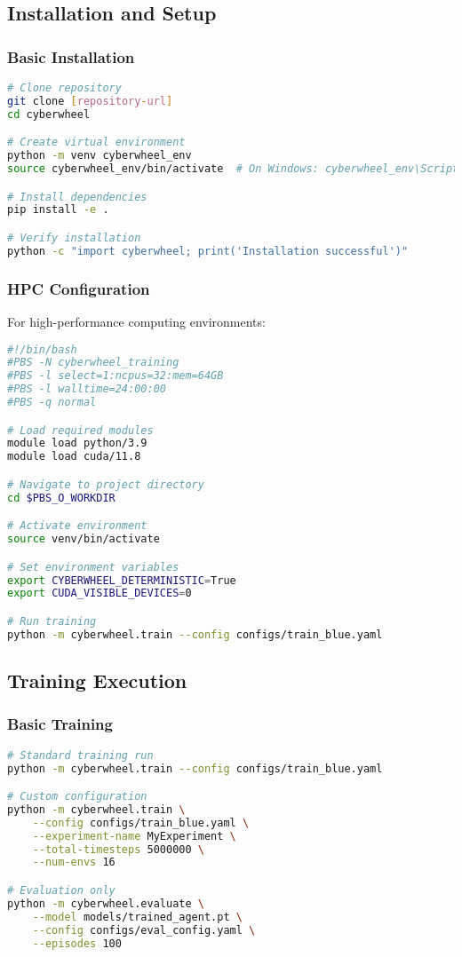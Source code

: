 \documentclass[12pt,a4paper]{article}
\begin{document}
\subsection{Installation and Setup}

\subsubsection{Basic Installation}
\begin{lstlisting}[language=bash, caption=Basic Setup]
# Clone repository
git clone [repository-url]
cd cyberwheel

# Create virtual environment
python -m venv cyberwheel_env
source cyberwheel_env/bin/activate  # On Windows: cyberwheel_env\Scripts\activate

# Install dependencies
pip install -e .

# Verify installation
python -c "import cyberwheel; print('Installation successful')"
\end{lstlisting}

\subsubsection{HPC Configuration}
For high-performance computing environments:

\begin{lstlisting}[language=bash, caption=HPC Setup Script]
#!/bin/bash
#PBS -N cyberwheel_training
#PBS -l select=1:ncpus=32:mem=64GB
#PBS -l walltime=24:00:00
#PBS -q normal

# Load required modules
module load python/3.9
module load cuda/11.8

# Navigate to project directory
cd $PBS_O_WORKDIR

# Activate environment
source venv/bin/activate

# Set environment variables
export CYBERWHEEL_DETERMINISTIC=True
export CUDA_VISIBLE_DEVICES=0

# Run training
python -m cyberwheel.train --config configs/train_blue.yaml
\end{lstlisting}

\subsection{Training Execution}

\subsubsection{Basic Training}
\begin{lstlisting}[language=bash, caption=Training Execution]
# Standard training run
python -m cyberwheel.train --config configs/train_blue.yaml

# Custom configuration
python -m cyberwheel.train \
    --config configs/train_blue.yaml \
    --experiment-name MyExperiment \
    --total-timesteps 5000000 \
    --num-envs 16

# Evaluation only
python -m cyberwheel.evaluate \
    --model models/trained_agent.pt \
    --config configs/eval_config.yaml \
    --episodes 100
\end{lstlisting}
\end{document}
